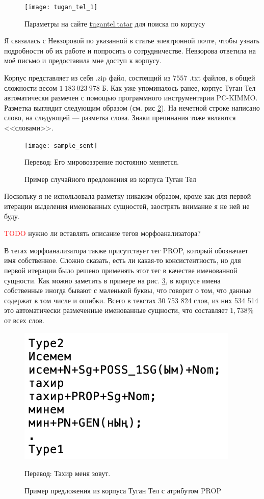 \begin{figure}
\caption{Параметры на сайте \href{http://tugantel.tatar/}{tugantel.tatar} для поиска по корпусу}
\texttt{[image: tugan\_tel\_1]}
\label{fig:tugan_tel_1}
\end{figure}


Я связалась с Невзоровой по указанной в статье электронной почте, чтобы узнать подробности об их работе и попросить о сотрудничестве. Невзорова ответила на моё письмо и предоставила мне доступ к корпусу.

Корпус представляет из себя .zip файл, состоящий из $7557$ .txt файлов, в общей сложности весом $1\ 183\ 023\ 978$ Б. Как уже упоминалось ранее, корпус Туган Тел автоматически размечен с помощью программного инструментарии PC-KIMMO. Разметка выглядит следующим образом (см. рис \ref{fig:sample_sent}). На нечетной строке написано слово, на следующей --- разметка слова. Знаки препинания тоже являются <<словами>>.

\begin{figure}
\caption{Пример случайного предложения из корпуса Туган Тел}
\texttt{[image: sample\_sent]}
\label{fig:sample_sent}

Перевод: Его мировоззрение постоянно меняется.
\end{figure}

Поскольку я не использовала разметку никаким образом, кроме как для первой итерации выделения именованных сущностей, заострять внимание я не ней не буду.

\textcolor{red}{TODO} нужно ли вставлять описание тегов морфоанализатора?

В тегах морфоанализатора также присутствует тег PROP, который обозначает имя собственное. Сложно сказать, есть ли какая-то консистентность, но для первой итерации было решено применять этот тег в качестве именованной сущности. Как можно заметить в примере на рис. \ref{fig:prop_sent}, в корпусе имена собственные иногда бывают с маленькой буквы, что говорит о том, что данные содержат в том числе и ошибки.
Всего в текстах 30 753 824 слов, из них 534 514 это автоматически размеченные именованные сущности, что составляет $1,738\%$ от всех слов. 

\begin{figure}
\caption{Пример предложения из корпуса Туган Тел с атрибутом PROP}
\includegraphics{pics/prop_sent}
\label{fig:prop_sent}

Перевод: Тахир меня зовут.
\end{figure}

